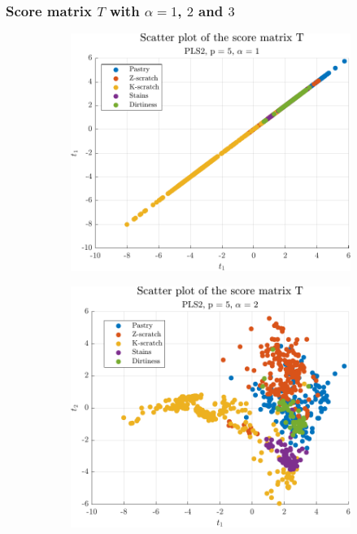 \begin{frame}
	\frametitle{Score matrix $T$ with $\alpha = 1$, $2$ and $3$}
	\begin{figure}
		\begin{subfigure}[b]{0.49\textwidth}
			\includegraphics[width=\textwidth]{Images/scatter_T_a1_p5.pdf}
		\end{subfigure}
		\hfill
		\begin{subfigure}[b]{0.49\textwidth}
			\includegraphics[width=\textwidth]{Images/scatter_T_a2_p5.pdf}
		\end{subfigure}
	\end{figure}
\end{frame}

